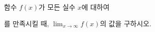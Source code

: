 함수 $f(x)$가 모든 실수 $x$에 대하여 \par\smallskip{}\par\smallskip\noindent 를 만족시킬 때, $\displaystyle\lim_{x\to\infty}f(x)$의 값을 구하시오.
